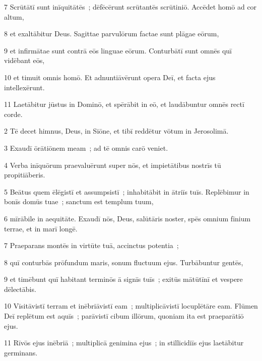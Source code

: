 \psalmVerse
  {\phantom{00}7}
  {Scrūtātī sunt inīquitātēs~; dēfēcērunt scrūtantēs scrūtiniō. Accēdet homō ad cor altum,}


\psalmVerse
  {\phantom{00}8}
  {et exaltābitur Deus. Sagittae parvulōrum factae sunt plāgae eōrum,}


\psalmVerse
  {\phantom{00}9}
  {et infirmātae sunt contrā eōs linguae eōrum. Conturbātī sunt omnēs quī vidēbant eōs,}


\psalmVerse
  {\phantom{0}10}
  {et timuit omnis homō. Et adnuntiāvērunt opera Deī, et facta ejus intellexērunt.}


\psalmVerse
  {\phantom{0}11}
  {Laetābitur jūstus in Dominō, et spērābit in eō, et laudābuntur omnēs rectī corde.}




\psalmVerse
  {\phantom{00}2}
  {Tē decet himnus, Deus, in Siōne, et tibī reddētur vōtum in Jerosolimā.}


\psalmVerse
  {\phantom{00}3}
  {Exaudī ōrātiōnem meam~; ad tē omnis carō veniet.}


\psalmVerse
  {\phantom{00}4}
  {Verba inīquōrum praevaluērunt super nōs, et impietātibus nostrīs tū propitiāberis.}


\psalmVerse
  {\phantom{00}5}
  {Beātus quem ēlēgistī et assumpsistī~; inhabitābit in ātriīs tuīs. Replēbimur in bonīs domūs tuae~; sanctum est templum tuum,}


\psalmVerse
  {\phantom{00}6}
  {mīrābile in aequitāte. Exaudī nōs, Deus, salūtāris noster, spēs omnium fīnium terrae, et in marī longē.}


\psalmVerse
  {\phantom{00}7}
  {Praeparans montēs in virtūte tuā, accinctus potentia~;}


\psalmVerse
  {\phantom{00}8}
  {quī conturbās prōfundum maris, sonum fluctuum ejus. Turbābuntur gentēs,}


\psalmVerse
  {\phantom{00}9}
  {et timēbunt quī habitant terminōs ā signīs tuīs~; exitūs mātūtīnī et vespere dēlectābis.}


\psalmVerse
  {\phantom{0}10}
  {Vīsitāvistī terram et inēbriāvistī eam~; multiplicāvistī locuplētāre eam. Flūmen Deī replētum est aquīs~; parāvistī cibum illōrum, quoniam ita est praeparātiō ejus.}


\psalmVerse
  {\phantom{0}11}
  {Rīvōs ejus inēbriā~; multiplicā genimina ejus~; in stillicidiīs ejus laetābitur germinans.}


